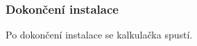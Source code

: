 \documentclass[12pt,czech]{article}
\begin{document}
\subsubsection*{Dokončení instalace}
Po dokončení instalace se kalkulačka spustí.
\begin{figure}[h]
\centering
{}
\end{figure}
\end{document}
